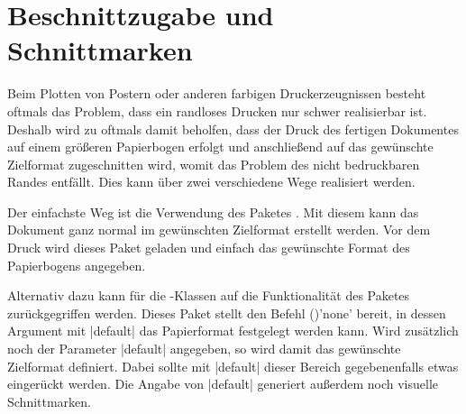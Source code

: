 \section{Beschnittzugabe und Schnittmarken}
%
%
%
%
Beim Plotten von Postern oder anderen farbigen Druckerzeugnissen besteht 
oftmals das Problem, dass ein randloses Drucken nur schwer realisierbar ist. 
Deshalb wird zu oftmals damit beholfen, dass der Druck des fertigen Dokumentes 
auf einem größeren Papierbogen erfolgt und anschließend auf das gewünschte 
Zielformat zugeschnitten wird, womit das Problem des nicht bedruckbaren Randes 
entfällt. Dies kann über zwei verschiedene Wege realisiert werden.

Der einfachste Weg ist die Verwendung des Paketes . Mit diesem 
kann das Dokument ganz normal im gewünschten Zielformat erstellt werden. Vor 
dem Druck wird dieses Paket geladen und einfach das gewünschte Format des 
Papierbogens angegeben. 
%
\begin{quoting}[rightmargin=0pt]
\end{quoting}
%
Alternativ dazu kann für die \TUDScript-Klassen auf die Funktionalität des 
Paketes  zurückgegriffen werden. Dieses Paket stellt den 
Befehl ()'none' bereit, in dessen Argument mit
|default|
das Papierformat festgelegt werden kann. Wird zusätzlich noch der Parameter 
|default|
angegeben, so wird damit das gewünschte Zielformat definiert. Dabei sollte mit
|default|
dieser Bereich gegebenenfalls etwas eingerückt werden. Die Angabe von 
|default|
generiert außerdem noch visuelle Schnittmarken. 
%
\begin{quoting}[rightmargin=0pt]
\end{quoting}
